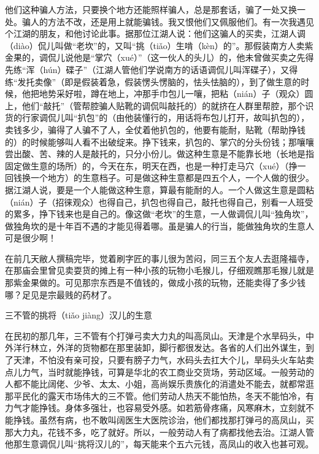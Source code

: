 \documentclass[12pt,UTF8]{ctexbook}
\begin{document}
他们这种骗人方法，只要换个地方还能照样骗人，总是那套话，骗了一处又换一处。骗人的方法不改，还是用上就能骗钱。我又恨他们又佩服他们。有一次我遇见个江湖的朋友，和他讨论此事。据那位江湖人说：他们这骗人的买卖，江湖人调（diào）侃儿叫做“老坎”的，又叫“挑（tiǎo）生啃（kèn）的”。那假装南方人卖紫金果的，调侃儿说他是“掌穴（xué）”（这一伙人的头儿）的，他未曾做买卖之先得先练“浑（hún）碟子”（江湖人管他们学说南方的话语调侃儿叫浑碟子），又得练“发托卖像”（即是假装着急，假装愣头愣脑的，怯头怯脑的），到了做生意的时候，他把地势采好啦，蹲在地上，冲那手巾包儿一嚷，把粘（nián）子（观众）圆上，他们“敲托”（管帮腔骗人贴靴的调侃叫敲托的）的就挤在人群里帮腔，那个识货的行家调侃儿叫“扒包”的（由他装懂行的，用话将布包儿打开，故叫扒包的），卖钱多少，骗得了人骗不了人，全仗着他扒包的，他要有能耐，贴靴（帮助挣钱的）的时候能够叫人看不出破绽来。挣下钱来，扒包的、掌穴的分头份钱；那嚷嚷尝出酸、苦、辣的人是敲托的，只分小份儿。做这种生意是不能靠长地（长地是指固定做生意的场所）的，今天在东，明天在西，也是一种打走马穴（xué）（挣一回钱换一个地方）的生意档子。可是做这种生意都是四五个人，一个人做的很少。据江湖人说，要是一个人能做这种生意，算最有能耐的人。一个人做这生意是圆粘（nián）子（招徕观众）也得自己，扒包也得自己，敲托也得自己，别看一人班受的累多，挣下钱来也是自己的。像这做“老坎”的生意，一人做调侃儿叫“独角坎”，做独角坎的是十年百不遇的才能见得着哪。虽是骗人的行当，能做独角坎的生意人可是很少啊！

在前几天敝人撰稿完毕，觉着刷字匠的事儿很为苦闷，同三五个友人去逛隆福寺，在那庙会里曾见卖耍货的摊上有一种小孩的玩物小毛猴儿，仔细观瞧那毛猴儿就是那紫金果做的。可见那宗东西是不值钱的，做成小孩的玩物，还能卖得了多少钱哪？足见是宗最贱的药材了。





三不管的挑将（tiǎo jiàng）汉儿的生意


在民初的那几年，三不管有个打弹弓卖大力丸的叫高凤山。天津是个水旱码头，中外洋行林立，外洋的货物都在那里装卸，脚行都很发达。各省的人们出外谋生，到了天津，不怕没有亲可投，只要有膀子力气，水码头去扛大个儿，旱码头火车站卖点儿力气，当时就能挣钱，可算是华北的农工商业交货场，劳动区域。一般劳动的人都不能比阔佬、少爷、太太、小姐，高尚娱乐贵族化的消遣处不能去，就都常逛那平民化的露天市场伟大的三不管。他们劳动人热天不能怕热，冬天不能怕冷，有力气才能挣钱。身体多强壮，也容易受外感。如若筋骨疼痛，风寒麻木，立刻就不能挣钱。虽然有病，也不敢叫阔医生大医院诊治，他们都找那打弹弓的高凤山，买那大力丸，花钱不多，吃了就好。所以，一般劳动人有了病都找他去治。江湖人管他那生意调侃儿叫“挑将汉儿的”，每天能来个五六元钱，高凤山的收入也甚可观。
\end{document}
